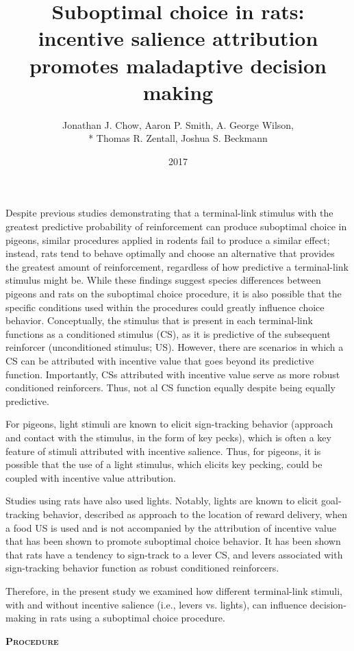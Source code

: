 \documentclass[a4paper,12pt]{article}
\title{Suboptimal choice in rats: incentive salience attribution promotes maladaptive decision making}
\author{Jonathan J. Chow, Aaron P. Smith, A. George Wilson,\\* Thomas R. Zentall, Joshua S. Beckmann}
\date{2017}
\begin{document}
{\scshape\bfseries \maketitle}

Despite previous studies demonstrating that a terminal-link stimulus with the greatest predictive probability of reinforcement can produce suboptimal choice in pigeons, similar procedures applied in rodents fail to produce a similar effect; instead, rats tend to behave optimally and choose an alternative that provides the greatest amount of reinforcement, regardless of how predictive a terminal-link stimulus might be. While these findings suggest species differences between pigeons and rats on the suboptimal choice procedure, it is also possible that the specific conditions used within the procedures could greatly influence choice behavior. Conceptually, the stimulus that is present in each terminal-link functions as a conditioned stimulus (CS), as it is predictive of the subsequent reinforcer (unconditioned stimulus; US). However, there are scenarios in which a CS can be attributed with incentive value that goes beyond its predictive function. Importantly, CSs attributed with incentive value serve as more robust conditioned reinforcers. Thus, not al CS function equally despite being equally predictive.

For pigeons, light stimuli are known to elicit sign-tracking behavior (approach and contact with the stimulus, in the form of key pecks), which is often a key feature of stimuli attributed with incentive salience. Thus, for pigeons, it is possible that the use of a light stimulus, which elicits key pecking, could be coupled with incentive value attribution.

Studies using rats have also used lights. Notably, lights are known to elicit goal-tracking behavior, described as approach to the location of reward delivery, when a food US is used and is not accompanied by the attribution of incentive value that has been shown to promote suboptimal choice behavior. It has been shown that rats have a tendency to sign-track to a lever CS, and levers associated with sign-tracking behavior function as robust conditioned reinforcers.

Therefore, in the present study we examined how different terminal-link stimuli, with and without incentive salience (i.e., levers vs. lights), can influence decision-making in rats using a suboptimal choice procedure.

{\scshape\bfseries Procedure}
\end{document}

